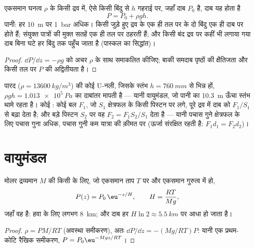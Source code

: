 \begin{corollary}[असंपीड्य तरल]\label{cor:b1:fluid-statics:incompressible}
एकसमान घनत्व $\rho$ के किसी द्रव में, ऐसे किसी बिंदु से $h$ गहराई पर,
जहाँ दाब $P_0$ है, दाब यह होता है
\[
P = P_0 + \rho gh .
\]
पानी: हर \qty{10}{m} पर \qty{1}{bar} अधिक। किसी जुड़े हुए द्रव के एक ही तल
पर के दो बिंदु एक ही दाब पर होते हैं; संयुक्त पात्रों की मुक्त सतहें एक ही
तल पर ठहरती हैं; और किसी बंद द्रव पर कहीं भी लगाया गया दाब बिना घटे हर
बिंदु तक पहुँच जाता है (पास्कल का सिद्धांत)।
\end{corollary}

\begin{proof}
$\dd P/\dd z = -\rho g$ को अचर $\rho$ के साथ समाकलित कीजिए; बाकी समदाब
पृष्ठों की क्षैतिजता और किसी तल पर $P$ की अद्वितीयता है।
\end{proof}

\begin{example}[दाबमापी और दाबयंत्र]\label{ex:b1:fluid-statics:manometer}
पारद ($\rho = \qty{13600}{kg/m^3}$) की कोई U-नली, जिसके स्तंभ
$h = \qty{760}{mm}$ से भिन्न हों, $\rho gh = \qty{1.013e5}{Pa}$ का दाबांतर
मापती है --- यानी वायुमंडल, जो पानी का \qty{10.3}{m} ऊँचा स्तंभ थामे रहता
है। कोई : कोई बल $F_1$, जो $S_1$ क्षेत्रफल के किसी पिस्टन
पर लगे, पूरे द्रव में दाब को $F_1/S_1$ से बढ़ा देता है; और बड़े पिस्टन $S_2$ पर वह
$F_2 = F_1S_2/S_1$ देता है --- यानी पचास गुने क्षेत्रफल के लिए पचास गुना
अधिक, पचास गुनी कम यात्रा की क़ीमत पर (ऊर्जा संरक्षित रहती है: $F_1d_1 = F_2d_2$)।
\end{example}

\section{वायुमंडल}

\begin{proposition}[समतापी वायुमंडल]\label{prop:b1:fluid-statics:atmosphere}
मोलर द्रव्यमान $M$ की किसी  के लिए, जो एकसमान ताप $T$ पर और
एकसमान गुरुत्व में हो,
\[
P(z) = P_0\,\eu^{-z/H}, \qquad H = \frac{RT}{Mg} ,
\]
जहाँ वह \emph{} है: हवा के लिए लगभग \qty{8}{km}; और दाब हर
$H\ln2 \approx \qty{5.5}{km}$ पर आधा हो जाता है।
\end{proposition}

\begin{proof}
$\rho = PM/RT$ (अवस्था समीकरण), अतः $\dd P/\dd z = -(Mg/RT)P$: यानी एक
प्रथम-कोटि रैखिक समीकरण, $P = P_0\eu^{-Mgz/RT}$।
\end{proof}

